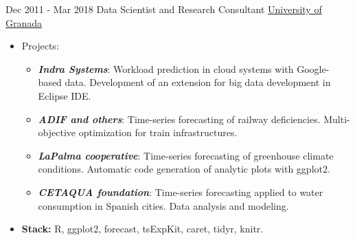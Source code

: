 \documentclass[letterpaper]{twentysecondcv} %
\begin{document}
\begin{twenty}
        
        
	  \twentyitem
    	{Dec 2011 -}
		{Mar 2018}
        {Data Scientist and Research Consultant}
        {\href{https://www.indracompany.com/en/}{University of Granada}}
        {
        \begin{itemize}
        	\item Projects:
        	\begin{itemize}
        		\item \textbf{\textit{Indra Systems}}: Workload prediction in cloud systems with Google-based data. Development of an extension for big data development in Eclipse IDE.
        		\item \textbf{\textit{ADIF and others}}: Time-series forecasting of railway deficiencies. Multi-objective optimization for train infrastructures.
        		\item \textbf{\textit{LaPalma cooperative}}: Time-series forecasting of greenhouse climate conditions. Automatic code generation of analytic plots with ggplot2.
        		\item \textbf{\textit{CETAQUA foundation}}: Time-series forecasting applied to water consumption in Spanish cities. Data analysis and modeling.
        	\end{itemize}
        	\item \textbf{Stack:} R, ggplot2, forecast, tsExpKit, caret, tidyr, knitr.
        

\end{itemize}}
\end{twenty}
\end{document}
